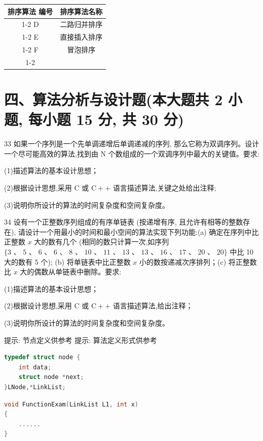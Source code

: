\begin{center}
\begin{tabular}{|c|c|}
\hline
排序算法 编号 & 排序算法名称 \\
\cline{1-2}
D & 二路归并排序 \\
\cline{1-2}
E & 直接插入排序 \\
\cline{1-2}
F & 冒泡排序 \\
\cline{1-2}
\hline
\end{tabular}
\end{center}
\vspace{10em}

\section*{四、算法分析与设计题(本大题共 2 小题, 每小题 15 分, 共 30 分)}

33 如果一个序列是一个先单调递增后单调递减的序列, 那么它称为双调序列。设计一个尽可能高效的算法,找到由 \(\mathrm{N}\) 个数组成的一个双调序列中最大的关键值。要求:

(1)描述算法的基本设计思想；

(2)根据设计思想,采用 \(\mathrm{C}\) 或 \(\mathrm{C} +  +\) 语言描述算法,关键之处给出注释;

(3)说明你所设计的算法的时间复杂度和空间复杂度。
\vspace{15em}

34 设有一个正整数序列组成的有序单链表 (按递增有序, 且允许有相等的整数存在), 请设计一个用最小的时间和最小空间的算法实现下列功能:(a) 确定在序列中比正整数 \(x\) 大的数有几个 (相同的数只计算一次,如序列 \(\{ 3\text{ 、 }5\text{ 、 }6\text{ 、 }6\text{ 、 }8\text{ 、 }{10}\text{ 、 }{11}\text{ 、 }{13}\text{ 、 }{13}\) 、 \({16}\text{ 、 }{17}\text{ 、 }{20}\text{ 、 }{20}\}\) 中比 10 大的数有 5 个); (b) 将单链表中比正整数 \(x\) 小的数按递减次序排列；(c) 将正整数比 \(x\) 大的偶数从单链表中删除。要求:

(1)描述算法的基本设计思想；

(2)根据设计思想,采用 \(\mathrm{C}\) 或 \(\mathrm{C} +  +\) 语言描述算法,给出注释；

(3)说明你所设计的算法的时间复杂度和空间复杂度。



提示: 节点定义供参考 提示: 算法定义形式供参考

\begin{lstlisting}[language=C, basicstyle=\ttfamily]
typedef struct node {
    int data;
    struct node *next;
}LNode,*LinkList;
\end{lstlisting}

\begin{lstlisting}[language=C, basicstyle=\ttfamily]
void FunctionExam(LinkList L1, int x) 
{
    ......
}
\end{lstlisting}


